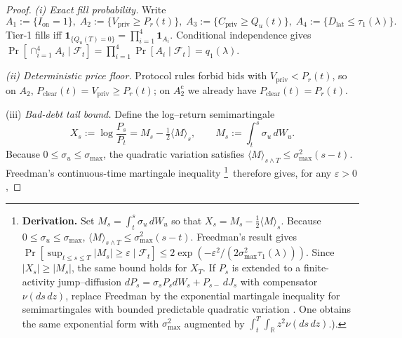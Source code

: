 \documentclass[11pt]{article}
\begin{document}
\begin{proof}
\emph{(i) Exact fill probability.}
Write
\(
  A_1:=\{I_{\mathrm{on}}=1\},\;
  A_2:=\{V_{\mathrm{priv}}\ge P_r(t)\},\;
  A_3:=\{C_{\mathrm{priv}}\ge Q_u(t)\},\;
  A_4:=\{D_{\mathrm{lat}}\le\tau_1(\lambda)\}.
\)
Tier-1 fills iff
\(
  \mathbf 1_{\{Q_u(T)=0\}}=\prod_{i=1}^4\mathbf 1_{A_i}.
\)
Conditional independence gives
\(
  \Pr[\cap_{i=1}^4A_i\mid\mathcal F_t]
     =\prod_{i=1}^4\Pr[A_i\mid\mathcal F_t]
     =q_1(\lambda).
\)

\smallskip
\noindent
\emph{(ii) Deterministic price floor.}
Protocol rules forbid bids with
$V_{\mathrm{priv}}<P_r(t)$, so on $A_2$,
$P_{\mathrm{clear}}(t)=V_{\mathrm{priv}}\ge P_r(t)$; on $A_2^{\mathrm c}$
we already have $P_{\mathrm{clear}}(t)=P_r(t)$.

\smallskip
\noindent

\item[(iii)]  \emph{Bad-debt tail bound.}
      Define the log–return semimartingale
      \[
         X_s:=\log\frac{P_s}{P_t}
              =M_s-\tfrac12\langle M\rangle_s,
         \qquad
         M_s:=\int_t^s\sigma_u\,dW_u.
      \]
      Because \(0\le\sigma_u\le\sigma_{\max}\),
      the quadratic variation satisfies
      \(\langle M\rangle_{s\wedge T}
          \le\sigma_{\max}^2(s-t)\).
      Freedman’s continuous-time martingale inequality%
\footnote{%
\textbf{Derivation.}  Set
\(M_s=\int_t^s\sigma_u\,dW_u\)
so that
\(X_s=M_s-\frac12\langle M\rangle_s\).
Because \(0\!\le\!\sigma_u\!\le\!\sigma_{\max}\),
\(\langle M\rangle_{s\wedge T}\le\sigma_{\max}^2(s-t)\).
Freedman’s result \parencite[Th.\,2]{freedman1975}
gives
\(
  \Pr[\sup_{t\le s\le T}|M_s|\ge\varepsilon\mid\mathcal F_t]
  \le 2\exp(-\varepsilon^{2}/(2\sigma_{\max}^{2}\tau_1(\lambda))).
\)
Since \(|X_s|\ge|M_s|\), the same bound holds for \(X_T\).
If \(P_s\) is extended to a finite-activity
      jump–diffusion
      \(dP_s=\sigma_s P_s dW_s+P_{s-}\,dJ_s\)
      with compensator
      \(\nu(ds\,dz)\),
      replace Freedman by the exponential martingale inequality for
      semimartingales with bounded predictable quadratic variation
      \parencite[Th.\,8.7]{applebaum2009}.  One obtains the same
      exponential form with
      \(\sigma_{\max}^2\) augmented by
      \(\int_{t}^{T}\!\!\int_{\mathbb R}z^2\nu(ds\,dz)\).).
}\,
therefore gives, for any \(\varepsilon>0\),


\end{proof}
\end{document}
